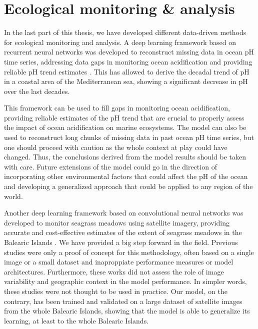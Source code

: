 \section{Ecological monitoring \& analysis}

In the last part of this thesis, we have developed different data-driven
methods for ecological monitoring and analysis. A deep learning framework based
on recurrent neural networks was developed to reconstruct missing data in ocean
pH time series, addressing data gaps in monitoring ocean acidification and
providing reliable pH trend estimates \cite{Flecha2022}. This has allowed to
derive the decadal trend of pH in a coastal area of the Mediterranean sea,
showing a significant decrease in pH over the last decades.

This framework can be used to fill gaps in monitoring ocean acidification,
providing reliable estimates of the pH trend that are crucial to properly
assess the impact of ocean acidification on marine ecosystems. The model can
also be used to reconstruct long chunks of missing data in past ocean pH time
series, but one should proceed with caution as the whole context at play could
have changed. Thus, the conclusions derived from the model results should be
taken with care. Future extensions of the model could go in the direction of
incorporating other environmental factors that could affect the pH of the ocean
and developing a generalized approach that could be applied to any region of
the world.

Another deep learning framework based on convolutional neural networks was
developed to monitor seagrass meadows using satellite imagery, providing
accurate and cost-effective estimates of the extent of seagrass meadows in the
Balearic Islands \cite{GimenezRomero2024_posi}. We have provided a big step
forward in the field. Previous studies were only a proof of concept for this
methodology, often based on a single image or a small dataset and inaproppiate
performance measures or model architectures. Furthermore, these works did not
assess the role of image variability and geographic context in the model
performance. In simpler words, these studies were not thought to be used in
practice. Our model, on the contrary, has been trained and validated on a large
dataset of satellite images from the whole Balearic Islands, showing that the
model is able to generalize its learning, at least to the whole Balearic
Islands.

